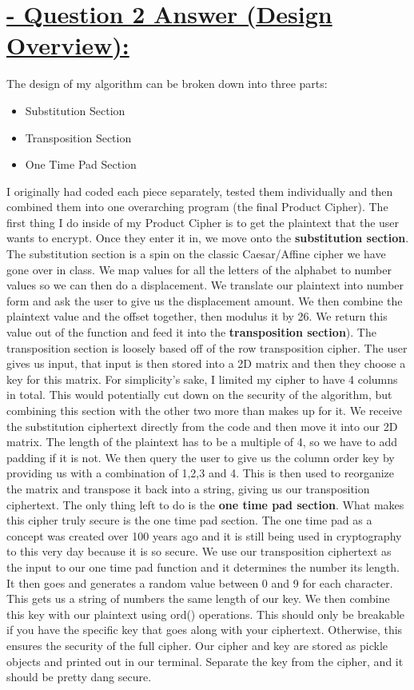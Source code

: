 \documentclass{article}
\begin{document}
\section{\underline{ - Question 2 Answer (Design Overview):}}
The design of my algorithm can be broken down into three parts: 

\begin{itemize}
	\item Substitution Section
	\item Transposition Section
	\item One Time Pad Section
\end{itemize}
I originally had coded each piece separately, tested them individually and then combined them into one overarching program (the final Product Cipher).
The first thing I do inside of my Product Cipher is to get the plaintext that the user wants to encrypt. Once they enter it in, we move onto the \textbf{substitution section}. 
The substitution section is a spin on the classic Caesar/Affine cipher we have gone over in class. We map values for all the letters of the alphabet to number values so we can then do a displacement. We translate our plaintext into number form and ask the user to give us the displacement amount. We then combine the plaintext value and the offset together, then modulus it by 26. We return this value out of the function and feed it into the \textbf{transposition section}). \newline
The transposition section is loosely based off of the row transposition cipher. The user gives us input, that input is then stored into a 2D matrix and then they choose a key for this matrix. For simplicity's sake, I limited my cipher to have 4 columns in total. This would potentially cut down on the security of the algorithm, but combining this section with the other two more than makes up for it. We receive the substitution ciphertext directly from the code and then move it into our 2D matrix. The length of the plaintext has to be a multiple of 4, so we have to add padding if it is not. We then query the user to give us the column order key by providing us with a combination of 1,2,3 and 4. This is then used to reorganize the matrix and transpose it back into a string, giving us our transposition ciphertext. The only thing left to do is the \textbf{one time pad section}.\newline
What makes this cipher truly secure is the one time pad section. The one time pad as a concept was created over 100 years ago and it is still being used in cryptography to this very day because it is so secure. We use our transposition ciphertext as the input to our one time pad function and it determines the number its length. It then goes and generates a random value between 0 and 9 for each character. This gets us a string of numbers the same length of our key. We then combine this key with our plaintext using ord() operations. This should only be breakable if you have the specific key that goes along with your ciphertext. Otherwise, this ensures the security of the full cipher. Our cipher and key are stored as pickle objects and printed out in our terminal. Separate the key from the cipher, and it should be pretty dang secure. \newline
\end{document}
